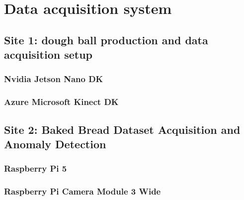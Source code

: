 
\chapter{Data acquisition system}

\section{Site 1: dough ball production and data acquisition setup}

\subsection{Nvidia Jetson Nano DK}

\subsection{Azure Microsoft Kinect DK}

\section{Site 2: Baked Bread Dataset Acquisition and Anomaly Detection}

\subsection{Raspberry Pi 5}

\subsection{Raspberry Pi Camera Module 3 Wide}

